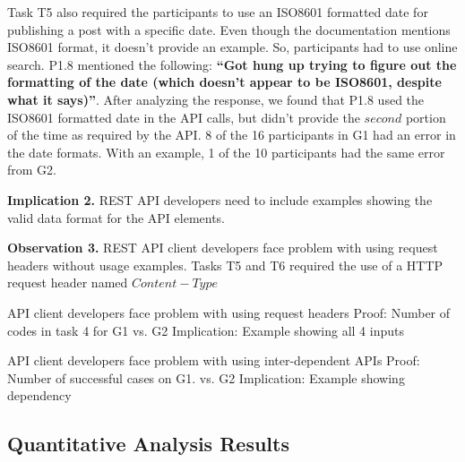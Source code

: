 \documentclass[conference]{IEEEtran}
\begin{document}
Task T5 also required the participants to use an ISO8601 formatted date for publishing a post with a specific date. Even though the documentation mentions ISO8601 format, it doesn't provide an example. So, participants had to use online search. P1.8 mentioned the following: \textbf{``Got hung up trying to figure out the formatting of the date (which doesn't appear to be ISO8601, despite what it says)''}. After analyzing the response, we found that P1.8 used the ISO8601 formatted date in the API calls, but didn't provide the $second$ portion of the time as required by the API. 8 of the 16 participants in G1 had an error in the date formats. With an example, 1 of the 10 participants had the same error from G2.

\textbf{Implication 2.} REST API developers need to include examples showing the valid data format for the API elements.


\textbf{Observation 3.} REST API client developers face problem with using request headers without usage examples. Tasks T5 and T6 required the use of a HTTP request header named $Content-Type$




  API client developers face problem with using request headers
    Proof: Number of codes in task 4 for G1 vs. G2
    Implication: Example showing all 4 inputs

  API client developers face problem with using inter-dependent APIs
    Proof: Number of successful cases on G1. vs. G2
    Implication: Example showing dependency


\subsection{Quantitative Analysis Results} %

\pgfplotsset{compat=1.14}
\usetikzlibrary{patterns}
\groupone
\end{document}
